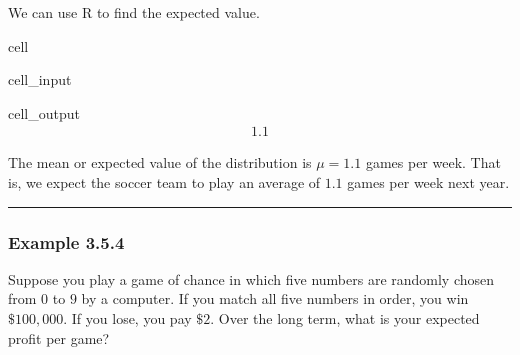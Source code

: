 \documentclass[letterpaper,10pt,english]{jupyterBook}
\begin{document}
\sphinxAtStartPar
We can use R to find the expected value.

\begin{sphinxuseclass}{cell}\begin{sphinxVerbatimInput}

\begin{sphinxuseclass}{cell_input}
\begin{sphinxVerbatim}[commandchars=\\\{\}]

\end{sphinxVerbatim}

\end{sphinxuseclass}\end{sphinxVerbatimInput}
\begin{sphinxVerbatimOutput}

\begin{sphinxuseclass}{cell_output}\begin{equation*}
\begin{split}1.1\end{split}
\end{equation*}
\end{sphinxuseclass}\end{sphinxVerbatimOutput}

\end{sphinxuseclass}
\sphinxAtStartPar
The mean or expected value of the distribution is \(\mu = 1.1\) games per week. That is, we expect the soccer team to play an average of \(1.1\) games per week next year.


\bigskip\hrule\bigskip



\subsubsection{Example 3.5.4}
\label{\detokenize{Ch3 Probability/3.5 Discrete Probability Distributions:example-3-5-4}}
\sphinxAtStartPar
Suppose you play a game of chance in which five numbers are randomly chosen from \(0\) to \(9\) by a computer. If you match all five numbers in order, you win \(\$100,000\). If you lose, you pay \(\$2\). Over the long term, what is your expected profit per game?
\end{document}
